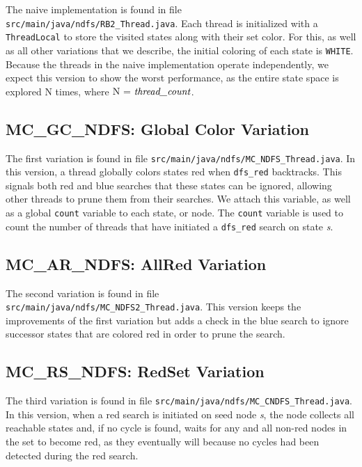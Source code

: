 \documentclass[a4paper]{article}
\begin{document}
The naive implementation is found in file \texttt{src/main/java/ndfs/RB2\_Thread.java}. Each thread is initialized with a \texttt{ThreadLocal}  to store the visited states along with their set color. For this, as well as all other variations that we describe, the initial coloring of each state is \texttt{WHITE}. Because the threads in the naive implementation operate independently, we expect this version to show the worst performance, as the entire state space is explored $\text{N}$ times, where $\text{N = \emph{thread\_count}}$.


\subsection{MC\_GC\_NDFS: Global Color Variation}

The first variation is found in file \texttt{src/main/java/ndfs/MC\_NDFS\_Thread.java}. In this version, a thread globally colors states red when \texttt{dfs\_red} backtracks. This signals both red and blue searches that these states can be ignored, allowing other threads to prune them from their searches. We attach this variable, as well as a global \texttt{count} variable to each state, or node. The \texttt{count} variable is used to count the number of threads that have initiated a \texttt{dfs\_red} search on state \emph{s}.


\subsection{MC\_AR\_NDFS: AllRed Variation}

The second variation is found in file \texttt{src/main/java/ndfs/MC\_NDFS2\_Thread.java}. This version keeps the improvements of the first variation but adds a check in the blue search to ignore successor states that are colored red in order to prune the search.


\subsection{MC\_RS\_NDFS: RedSet Variation}

The third variation is found in file \texttt{src/main/java/ndfs/MC\_CNDFS\_Thread.java}. In this version, when a red search is initiated on seed node \emph{s}, the node collects all reachable states and, if no cycle is found, waits for any and all non-red nodes in the set to become red, as they eventually will because no cycles had been detected during the red search.
\end{document}
